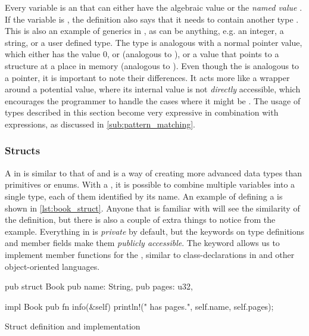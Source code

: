 Every  variable is an {\enum} that can either have the algebraic value  or the \emph{named value} .
If the variable is , the definition also says that it needs to contain another type .
This is also an example of generics in {\rust}, as  can be anything, e.g. an integer, a string, or a user defined type.
The  type is analogous with a normal {\C} pointer value, which either has the value 0, or  (analogous to ), or a value that points to a structure at a place in memory (analogous to ).
Even though the  is analogous to a {\C} pointer, it is important to note their differences.
It acts more like a wrapper around a potential value, where its internal value is not \emph{directly} accessible, which encourages the programmer to handle the cases where it might be .
The usage of {\enum} types described in this section become very expressive in combination with  expressions, as discussed in \autoref{sub:pattern_matching}.

\subsubsection{Structs}
\label{ssub:structs}

A  in {\rust} is similar to that of {\C} and is a way of creating more advanced data types than primitives or enums.
With a , it is possible to combine multiple variables into a single type, each of them identified by its name.
An example of defining a  is shown in \autoref{lst:book_struct}.
Anyone that is familiar with {\C} will see the similarity of the  definition, but there is also a couple of extra things to notice from the example.
Everything in {\rust} is \emph{private} by default, but the  keywords on type definitions and member fields make them \emph{publicly accessible}.
The  keyword allows us to implement member functions for the , similar to class-declarations in {\Cpp} and other object-oriented languages.

\begin{listing}[H]
  \begin{rustcode}
pub struct Book {
  pub name: String,
  pub pages: u32,
}

impl Book {
  pub fn info(&self) {
    println!("{} has {} pages.", self.name, self.pages);
  }
}
  \end{rustcode}
  \caption{Struct definition and implementation}
  \label{lst:book_struct}
\end{listing}

